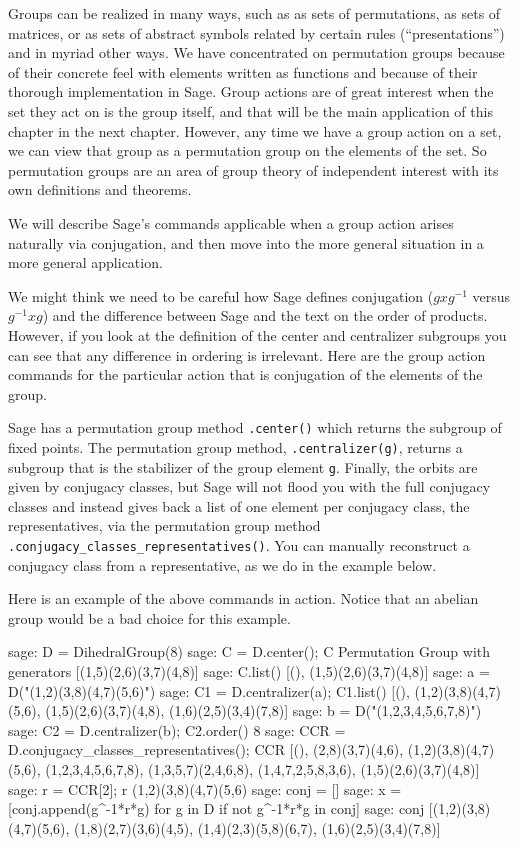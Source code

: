 Groups can be realized in many ways, such as as sets of permutations, as sets of matrices, or as sets of abstract symbols related by certain rules (``presentations'') and in myriad other ways.  We have concentrated on permutation groups because of their concrete feel with elements written as functions and because of their thorough implementation in Sage.  Group actions are of great interest when the set they act on is the group itself, and that will be the main application of this chapter in the next chapter.  However, any time we have a group action on a set, we can view that group as a permutation group on the elements of the set.  So permutation groups are an area of group theory of independent interest with its own definitions and theorems.\par
%
We will describe Sage's commands applicable when a group action arises naturally via conjugation, and then move into the more general situation in a more general application.\par
%
%
We might think we need to be careful how Sage defines conjugation ($gxg^{-1}$ versus $g^{-1}xg$) and the difference between Sage and the text on the order of products.  However, if you look at the definition of the center and centralizer subgroups you can see that any difference in ordering is irrelevant.  Here are the group action commands for the particular action that is conjugation of the elements of the group.\par
%
Sage has a permutation group method \verb?.center()? which returns the subgroup of fixed points.  The permutation group method, \verb?.centralizer(g)?, returns a subgroup that is the stabilizer of the group element \verb?g?.  Finally, the orbits are given by conjugacy classes, but Sage will not flood you with the full conjugacy classes and instead gives back a list of one element per conjugacy class, the representatives, via the permutation group method \verb?.conjugacy_classes_representatives()?.  You can manually reconstruct a conjugacy class from a representative, as we do in the example below.\par
%
Here is an example of the above commands in action.  Notice that an abelian group would be a bad choice for this example.
%
\begin{sageexample}
sage: D = DihedralGroup(8)
sage: C = D.center(); C
Permutation Group with generators [(1,5)(2,6)(3,7)(4,8)]
sage: C.list()
[(), (1,5)(2,6)(3,7)(4,8)]
sage: a = D("(1,2)(3,8)(4,7)(5,6)")
sage: C1 = D.centralizer(a); C1.list()
[(), (1,2)(3,8)(4,7)(5,6), (1,5)(2,6)(3,7)(4,8), (1,6)(2,5)(3,4)(7,8)]
sage: b = D("(1,2,3,4,5,6,7,8)")
sage: C2 = D.centralizer(b); C2.order()
8
sage: CCR = D.conjugacy_classes_representatives(); CCR
[(), (2,8)(3,7)(4,6), (1,2)(3,8)(4,7)(5,6), (1,2,3,4,5,6,7,8),
 (1,3,5,7)(2,4,6,8), (1,4,7,2,5,8,3,6), (1,5)(2,6)(3,7)(4,8)]
sage: r = CCR[2]; r
(1,2)(3,8)(4,7)(5,6)
sage: conj = []
sage: x = [conj.append(g^-1*r*g) for g in D if not g^-1*r*g in conj]
sage: conj
[(1,2)(3,8)(4,7)(5,6), (1,8)(2,7)(3,6)(4,5), (1,4)(2,3)(5,8)(6,7),
 (1,6)(2,5)(3,4)(7,8)]
\end{sageexample}
